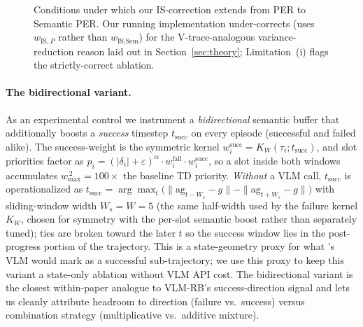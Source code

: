 \documentclass{article}
\begin{document}
\begin{figure}[t]
\centering
{}
\caption{Conditions under which our IS-correction extends from PER to
Semantic PER. Our running implementation under-corrects (uses
$w_{\text{IS},P}$ rather than $w_{\text{IS},\text{Sem}}$) for the
V-trace-analogous variance-reduction reason laid out in
Section~\ref{sec:theory}; Limitation~(i) flags the strictly-correct
ablation.}
\label{fig:assumption}
\end{figure}

\paragraph{The bidirectional variant.}
As an experimental control we instrument a \emph{bidirectional} semantic
buffer that additionally boosts a \emph{success} timestep
$t_{\text{succ}}$ on every episode (successful and failed alike). The
success-weight is the symmetric kernel
$w^{\text{succ}}_i = K_W(\tau_i;t_{\text{succ}})$, and slot priorities
factor as $p_i = (|\delta_i|+\varepsilon)^\alpha \cdot w^{\text{fail}}_i
\cdot w^{\text{succ}}_i$, so a slot inside both windows accumulates
$w_{\max}^{\,2}\!=\!100\!\times$ the baseline TD priority.
\emph{Without} a VLM call, $t_{\text{succ}}$ is operationalized as
$t_{\text{succ}}\!=\!\arg\max_t\bigl(\|\text{ag}_{t-W_s}\!-\!g\|
- \|\text{ag}_{t+W_s}\!-\!g\|\bigr)$ with sliding-window width
$W_s\!=\!W\!=\!5$ (the same half-width used by the failure kernel
$K_W$, chosen for symmetry with the per-slot semantic boost rather
than separately tuned); ties are broken toward the later $t$ so the
success window lies in the post-progress portion of the trajectory.
This is a state-geometry proxy for what
\citet{sharony2026vlmrb}'s VLM would mark as a successful
sub-trajectory; we use this proxy to keep this variant a state-only
ablation without VLM API cost. The bidirectional
variant is the closest within-paper analogue to VLM-RB's success-direction
signal and lets us cleanly attribute headroom to direction (failure
vs.\ success) versus combination strategy (multiplicative vs.\ additive
mixture).
\end{document}
